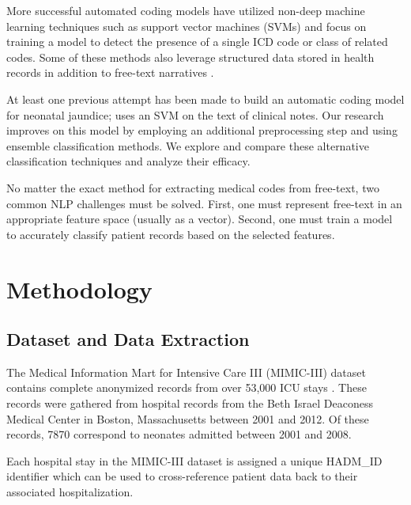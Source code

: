 \documentclass[conference]{IEEEtran}
\begin{document}
More successful automated coding models have utilized non-deep machine learning techniques such as support vector machines (SVMs) \cite{Cortes} and focus on training a model to detect the presence of a single ICD code or class of related codes. Some of these methods also leverage structured data stored in health records in addition to free-text narratives \cite{Ferrao}.

At least one previous attempt has been made to build an automatic coding model for neonatal jaundice; \cite{Marafino} uses an SVM on the text of clinical notes. Our research improves on this model by employing an additional preprocessing step and using ensemble classification methods. We explore and compare these alternative classification techniques and analyze their efficacy.

No matter the exact method for extracting medical codes from free-text, two common NLP challenges must be solved. First, one must represent free-text in an appropriate feature space (usually as a vector). Second, one must train a model to accurately classify patient records based on the selected features. 

\section{Methodology}
\subsection{Dataset and Data Extraction}\label{AA}
The Medical Information Mart for Intensive Care III (MIMIC-III) dataset contains complete anonymized records from over 53,000 ICU stays \cite{Johnson}. These records were gathered from hospital records from the Beth Israel Deaconess Medical Center in Boston, Massachusetts between 2001 and 2012. Of these records, 7870 correspond to neonates admitted between 2001 and 2008. 

Each hospital stay in the MIMIC-III dataset is assigned a unique HADM\_ID identifier which can be used to cross-reference patient data back to their associated hospitalization.
\end{document}
